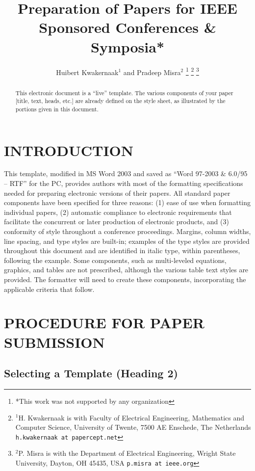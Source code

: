 \documentclass[letterpaper, 10 pt, conference]{ieeeconf}  %
\title{\LARGE \bf
Preparation of Papers for IEEE Sponsored Conferences \& Symposia*
}
\author{Huibert Kwakernaak$^{1}$ and Pradeep Misra$^{2}$%
\thanks{*This work was not supported by any organization}%
\thanks{$^{1}$H. Kwakernaak is with Faculty of Electrical Engineering, Mathematics and Computer Science,
        University of Twente, 7500 AE Enschede, The Netherlands
        {\tt\small h.kwakernaak at papercept.net}}%
\thanks{$^{2}$P. Misra is with the Department of Electrical Engineering, Wright State University,
        Dayton, OH 45435, USA
        {\tt\small p.misra at ieee.org}}%
}
\begin{document}
\maketitle
\thispagestyle{empty}
\pagestyle{empty}


\begin{abstract}

This electronic document is a ``live'' template. The various components of your paper [title, text, heads, etc.] are already defined on the style sheet, as illustrated by the portions given in this document.

\end{abstract}


\section{INTRODUCTION}

This template, modified in MS Word 2003 and saved as ``Word 97-2003 \& 6.0/95 -- RTF'' for the PC, provides authors with most of the formatting specifications needed for preparing electronic versions of their papers. All standard paper components have been specified for three reasons: (1) ease of use when formatting individual papers, (2) automatic compliance to electronic requirements that facilitate the concurrent or later production of electronic products, and (3) conformity of style throughout a conference proceedings. Margins, column widths, line spacing, and type styles are built-in; examples of the type styles are provided throughout this document and are identified in italic type, within parentheses, following the example. Some components, such as multi-leveled equations, graphics, and tables are not prescribed, although the various table text styles are provided. The formatter will need to create these components, incorporating the applicable criteria that follow.

\section{PROCEDURE FOR PAPER SUBMISSION}

\subsection{Selecting a Template (Heading 2)}
\end{document}
